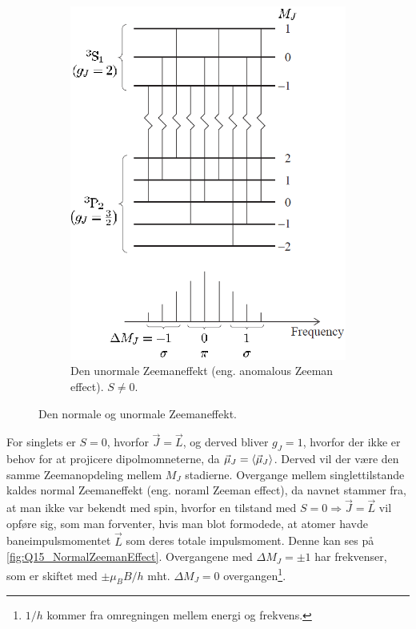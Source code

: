 \begin{figure}[!h]
\begin{subfigure}[t]{0.46\textwidth}
        \includegraphics[width=\columnwidth]{Q15/images/AnomalousZeemanEffect.PNG}
        \caption{Den unormale Zeemaneffekt (eng. anomalous Zeeman effect). $S \ne 0$.}
        \label{fig:Q15_AnomalousZeemanEffect}
    \end{subfigure}
    \caption{Den normale og unormale Zeemaneffekt.}
    \label{fig:Q15_TypesOfZeemanEffect}
\end{figure}

For singlets er $S = 0$, hvorfor $\Vec{J} = \Vec{L}$, og derved bliver $g_J = 1$, hvorfor der ikke er behov for at projicere dipolmomneterne, da $\Vec{\mu}_J = \Braket{\Vec{\mu}_J}$. Derved vil der være den samme Zeemanopdeling mellem $M_J$ stadierne. Overgange mellem singlettilstande kaldes \textsf{normal Zeemaneffekt} (eng. noraml Zeeman effect), da navnet stammer fra, at man ikke var bekendt med spin, hvorfor en tilstand med $S = 0 \Rightarrow \Vec{J} = \Vec{L}$ vil opføre sig, som man forventer, hvis man blot formodede, at atomer havde baneimpulsmomentet $\Vec{L}$ som deres totale impulsmoment. Denne kan ses på \cref{fig:Q15_NormalZeemanEffect}. Overgangene med $\Delta M_J = \pm 1$ har frekvenser, som er skiftet med $\pm \mu_B B / h$ mht. $\Delta M_J = 0$ overgangen\footnote{$1/h$ kommer fra omregningen mellem energi og frekvens.}.

